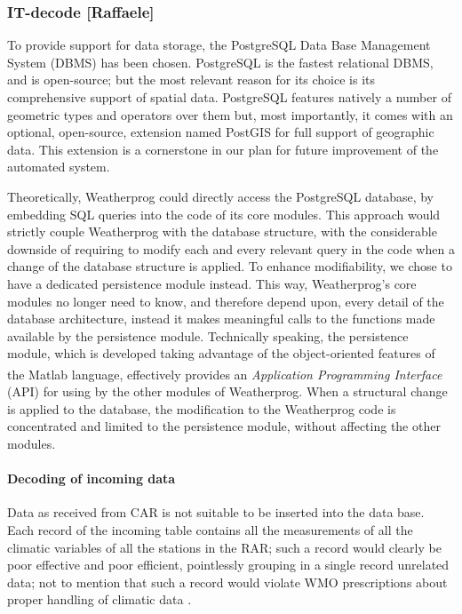 \documentclass[authoryear,preprint,review,12pt]{elsarticle}
\begin{document}
\subsubsection{IT-decode [Raffaele]}\label{decode}
To provide support for data storage, the PostgreSQL Data Base Management System (DBMS) \citep{postgres} has been chosen. PostgreSQL is the fastest relational DBMS, and is open-source; but the most relevant reason for its choice is its comprehensive support of spatial data. PostgreSQL features natively a number of geometric types and operators over them but, most importantly, it comes with an optional, open-source, extension named PostGIS for full support of geographic data. This extension is a cornerstone in our plan for future improvement of the automated system.

Theoretically, Weatherprog could directly access the PostgreSQL database, by embedding SQL queries into the code of its core modules. This approach would strictly couple Weatherprog with the database structure, with the considerable downside of requiring to modify each and every relevant query in the code when a change of the database structure is applied. To enhance modifiability, we chose to have a dedicated persistence module instead. This way, Weatherprog's core modules no longer need to know, and therefore depend upon, every detail of the database architecture, instead it makes meaningful calls to the functions made available by the persistence module. Technically speaking, the persistence module, which is developed taking advantage of the object-oriented features of the Matlab\textsuperscript{\circledR} language, effectively provides an \emph{Application Programming Interface} (API) for using by the other modules of Weatherprog. When a structural change is applied to the database, the modification to the Weatherprog code is concentrated and limited to the persistence module, without affecting the other modules.

 \paragraph{Decoding of incoming data} Data as received from CAR is not suitable to be inserted into the data base. Each record of the incoming table contains all the measurements of all the climatic variables of all the stations in the RAR; such a record would clearly be poor effective and poor efficient, pointlessly grouping in a single record unrelated data; not to mention that such a record would violate WMO prescriptions about proper handling of climatic data \citep{wcdmp:cdms}.
 
\end{document}
